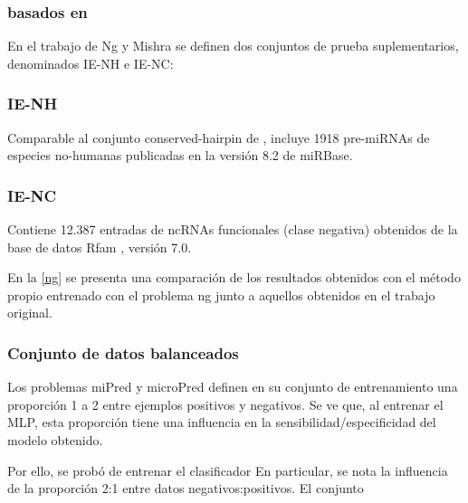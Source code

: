 \documentclass[12pt,bibliography=oldstyle,DIV=12,parskip=half-]{scrreprt}
\begin{document}
%
%
\subsubsection{basados en \citeauthor{ng}}
%
En el trabajo de Ng y Mishra \cite{ng} se
definen dos conjuntos de prueba suplementarios, denominados IE-NH e IE-NC:

%
\subsubsection{IE-NH}
%
Comparable al conjunto conserved-hairpin de \cite{xue}, incluye
1918 pre-miRNAs de especies no-humanas publicadas en la versión 8.2 de
miRBase.
%
\subsubsection{IE-NC}
%
Contiene 12.387 entradas de ncRNAs funcionales (clase negativa)
obtenidos de la base de datos Rfam \cite{rfam}, versión 7.0.

En la \autoref{ng} se presenta una comparación de los resultados
obtenidos con el método propio entrenado con el problema ng junto
a aquellos obtenidos en el trabajo original.


%
\subsubsection{Conjunto de datos balanceados}
%
Los problemas miPred y microPred definen en su conjunto de entrenamiento
una proporción 1 a 2 entre ejemplos positivos y negativos.
Se ve que, al entrenar el MLP, esta proporción tiene una influencia
en la sensibilidad/especificidad del modelo obtenido.

Por ello, se probó de entrenar el clasificador 
En particular, se nota la influencia de la proporción 2:1 entre datos
negativos:positivos.
El conjunto 
\end{document}
